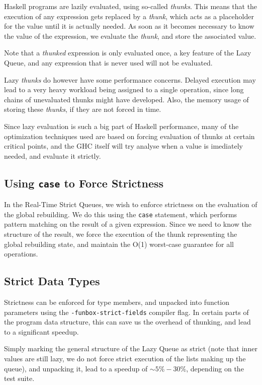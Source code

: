 Haskell programs are lazily evaluated, using so-called \textit{thunks}. This means that the execution of any expression gets replaced by a \textit{thunk}, which acts as a placeholder for the value until it is actually needed. As soon as it becomes necessary to know the value of the expression, we evaluate the \textit{thunk}, and store the associated value.

Note that a \textit{thunked} expression is only evaluated once, a key feature of the Lazy Queue, and any expression that is never used will not be evaluated. 

Lazy \textit{thunks} do however have some performance concerns. Delayed execution may lead to a very heavy workload being assigned to a single operation, since long chains of unevaluated thunks might have developed. Also, the memory usage of storing these \textit{thunks}, if they are not forced in time.

Since lazy evaluation is such a big part of Haskell performance, many of the optimization techniques used are based on forcing evaluation of thunks at certain critical points, and the GHC itself will try analyse when a value is imediately needed, and evaluate it strictly.

\subsection{Using \texttt{case} to Force Strictness}

In the Real-Time Strict Queues, we wish to enforce strictness on the evaluation of the global rebuilding. We do this using the \texttt{case} statement, which performs pattern matching on the result of a given expression. Since we need to know the structure of the result, we force the execution of the thunk representing the global rebuilding state, and maintain the O(1) worst-case guarantee for all operations.

\subsection{Strict Data Types} Strictness can be enforced for type members, and unpacked into function parameters using the \texttt{-funbox-strict-fields} compiler flag. In certain parts of the program data structure, this can save us the overhead of thunking, and lead to a significant speedup.

Simply marking the general structure of the Lazy Queue as strict (note that inner values are still lazy, we do not force strict execution of the lists making up the queue), and unpacking it, lead to a speedup of $\sim 5\%-30\%$, depending on the test suite.

